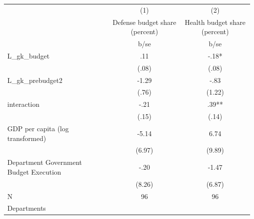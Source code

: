 {
\def\sym#1{\ifmmode^{#1}\else\(^{#1}\)\fi}
\begin{tabular}{l*{2}{c}}
\hline\hline
                                                  &\multicolumn{1}{c}{(1)}&\multicolumn{1}{c}{(2)}\\
                                                  &\multicolumn{1}{c}{Defense budget share (percent)}&\multicolumn{1}{c}{Health budget share (percent)}\\
                                                  &        b/se   &        b/se   \\
\hline
L\_gk\_budget                                       &         .11   &        -.18*  \\
                                                  &       (.08)   &       (.08)   \\
L\_gk\_prebudget2                                   &       -1.29   &        -.83   \\
                                                  &       (.76)   &      (1.22)   \\
interaction                                       &        -.21   &         .39** \\
                                                  &       (.15)   &       (.14)   \\
GDP per capita (log transformed)                  &       -5.14   &        6.74   \\
                                                  &      (6.97)   &      (9.89)   \\
Department Government Budget Execution            &        -.20   &       -1.47   \\
                                                  &      (8.26)   &      (6.87)   \\
\hline
N                                                 &          96   &          96   \\
Departments                                       &               &               \\
\hline\hline
\end{tabular}
}
